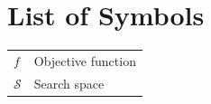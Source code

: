\chapter*{List of Symbols}

\begin{table}[ht!]
		\begin{tabular}{l l}
			$f$ & Objective function\\
			$\mathcal{S}$ & Search space\\
		\end{tabular}
\end{table}